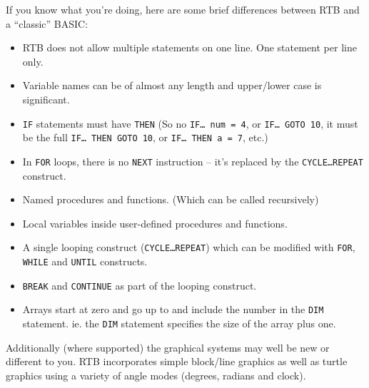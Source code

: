 If you know what you're doing, here are some brief differences between
RTB and a ``classic'' BASIC:
\begin{itemize}
\item RTB does not allow multiple statements on one line.
One statement per line only.
\item Variable names can be of almost any length and upper/lower case
is significant.
\item {\tt IF} statements must have {\tt THEN} (So no {\tt IF\dots\
num = 4}, or {\tt IF\dots\ GOTO 10}, it must be the full {\tt IF\dots\
THEN GOTO 10}, or {\tt IF\dots\ THEN a = 7}, etc.)
\item In {\tt FOR} loops, there is no {\tt NEXT} instruction -- it's
replaced by the {\tt CYCLE\dots REPEAT} construct.
\item Named procedures and functions. (Which can be called recursively)
\item Local variables inside user-defined procedures and functions.
\item A single looping construct ({\tt CYCLE\dots REPEAT}) which can be
modified with {\tt FOR}, {\tt WHILE} and {\tt UNTIL} constructs.
\item {\tt BREAK} and {\tt CONTINUE} as part of the looping construct.
\item Arrays start at zero and go up to and include the number in the
{\tt DIM} statement. ie. the {\tt DIM} statement specifies the size of
the array plus one.
\end{itemize}
Additionally (where supported) the graphical systems may well be new or
different to you. RTB incorporates simple block/line graphics as well
as turtle graphics using a variety of angle modes (degrees, radians
and clock).
